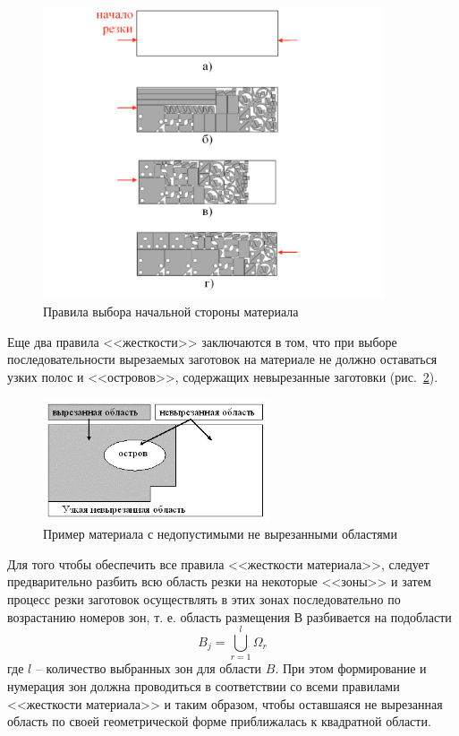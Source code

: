 \documentclass[11pt,twoside,openany]{report}
\begin{document}
\begin{figure}
  \begin{center}
  \includegraphics[width=0.9\textwidth]{list-hardness.png}
  \caption{Правила выбора начальной стороны материала }
  \label{list-hardness}
  \end{center}
\end{figure}

Еще два правила <<жесткости>> заключаются в том,
что при выборе последовательности вырезаемых заготовок
на материале не должно оставаться узких полос и <<островов>>,
содержащих невырезанные заготовки
(рис.~\ref{island}).

\begin{figure}[h]
  \begin{center}
  \includegraphics[width=0.6\textwidth]{island.png}
  \caption{Пример материала с недопустимыми не вырезанными областями}
  \label{island}
  \end{center}
\end{figure}

Для того чтобы обеспечить все правила <<жесткости материала>>,
следует предварительно разбить всю область резки на некоторые <<зоны>>
и затем процесс резки заготовок осуществлять
в этих зонах последовательно по возрастанию номеров зон,
т. е. область размещения $В$ разбивается на подобласти
\begin{equation}
  B_j = \bigcup_{r=1}^l \Omega_r
\end{equation}
где $l$
-- количество выбранных зон для области $B$.
При этом формирование и нумерация зон
должна проводиться в соответствии со всеми правилами
<<жесткости материала>> и таким образом,
чтобы оставшаяся не вырезанная область
по своей геометрической форме приближалась к квадратной области.
\end{document}
